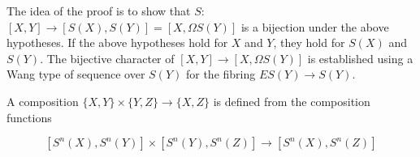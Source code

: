 The idea of the proof is to show that $S$: $[X, Y] \rightarrow [S(X), S(Y)] = [X, \Omega S(Y)]$ is a bijection under the above hypotheses. If the above hypotheses hold for $X$ and $Y$, they hold for $S(X)$ and $S(Y)$. The bijective character of $[X, Y] \rightarrow [X, \Omega S(Y)]$ is established using a Wang type of sequence over $S(Y)$ for the fibring $ES(Y) \rightarrow S(Y)$.

A composition $\{X, Y\} \times \{Y, Z\} \rightarrow \{X, Z\}$ is defined from the composition functions

$$[S^n(X), S^n(Y)] \times [S^n(Y), S^n(Z)] \rightarrow [S^n(X), S^n(Z)]$$

